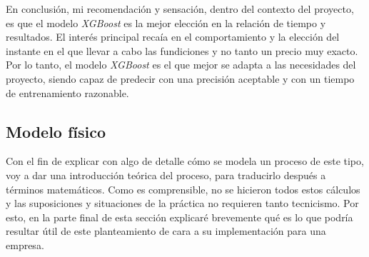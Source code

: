 En conclusión, mi recomendación y sensación, dentro del contexto del proyecto, es que el modelo \textit{XGBoost} es la mejor elección en la relación de tiempo y resultados. El interés principal recaía en el comportamiento y la elección del instante en el que llevar a cabo las fundiciones y no tanto un precio muy exacto. Por lo tanto, el modelo \textit{XGBoost} es el que mejor se adapta a las necesidades del proyecto, siendo capaz de predecir con una precisión aceptable y con un tiempo de entrenamiento razonable.
%
%
%
\subsection{Modelo físico}
%
%
Con el fin de explicar con algo de detalle cómo se modela un proceso de este tipo, voy a dar una introducción teórica del proceso, para traducirlo después a términos matemáticos. Como es comprensible, no se hicieron todos estos cálculos y las suposiciones y situaciones de la práctica no requieren tanto tecnicismo. Por esto, en la parte final de esta sección explicaré brevemente qué es lo que podría resultar útil de este planteamiento de cara a su implementación para una empresa.
%
%
%
